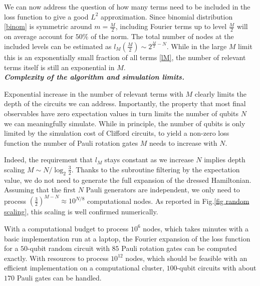 \documentclass[twocolumn, amsfonts, amssymb, aps, nofootinbib]{revtex4-2}
\begin{document}
We can now address the question of how many terms need to be included in the loss function to give a good $L^2$ approximation. Since binomial distribution \eqref{binom} is symmetric around $m=\frac{M}{2}$, including Fourier terms up to level $\frac{M}{2}$ will on average account for $50\%$ of the norm. The total number of nodes at the included levels can be estimated as $l_M(\frac{M}{2})\sim 2^{\frac{M}2-N}$. While in the large $M$ limit this is an exponentially small fraction of all terms \eqref{lM}, the number of relevant terms itself is still an exponential in $M$.
\\[4pt]
\textbf{\textit{Complexity of the algorithm and simulation limits.}}

Exponential increase in the number of relevant terms with $M$ clearly limits the depth of the circuits we can address. Importantly, the property that most final observables have zero expectation values in turn limits the number of qubits $N$ we can meaningfully simulate. While in principle, the number of qubits is only limited by the simulation cost of Clifford circuits, to yield a non-zero loss function the number of Pauli rotation gates $M$ needs to increase with $N$.

Indeed, the requirement that $l_M$ stays constant as we increase $N$ implies depth scaling $M\sim N/\log_2\frac32$. Thanks to the subroutine filtering by the expectation value, we do not need to generate the full expansion of the dressed Hamiltonian. Assuming that the first $N$ Pauli generators are independent, we only need to process $\left(\frac32\right)^{M-N}\approx 10^{N/8}$ computational nodes. As reported in Fig.\ref{fig random scaling}, this scaling is well confirmed numerically.

With a computational budget to process $10^6$ nodes, which takes minutes with a basic implementation run at a laptop, the Fourier expansion of the loss function for a $50$-qubit random circuit with $85$ Pauli rotation gates can be computed exactly. With resources to process $10^{12}$ nodes, which should be feasible with an efficient implementation on a computational cluster, $100$-qubit circuits with about $170$ Pauli gates can be handled.
\end{document}
